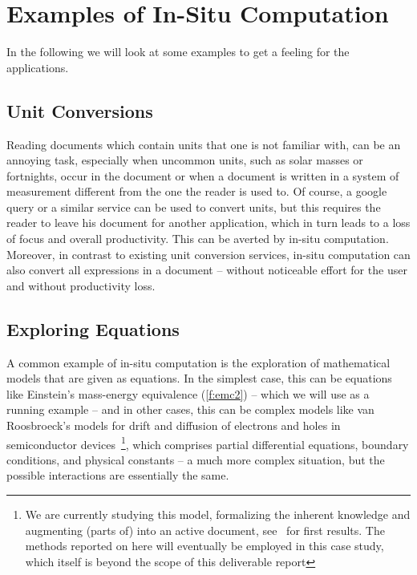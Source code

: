 \section{Examples of In-Situ Computation}\label{sec:examples}

In the following we will look at some examples to get a feeling for the applications.

\subsection{Unit Conversions}\label{sec:ex:units}
Reading documents which contain units that one is not familiar with, can be an annoying
task, especially when uncommon units, such as solar masses or fortnights, occur in the
document or when a document is written in a system of measurement different from the one
the reader is used to.  Of course, a google query or a similar service can be used to
convert units, but this requires the reader to leave his document for another application,
which in turn leads to a loss of focus and overall productivity.  This can be averted by
in-situ computation. Moreover, in contrast to existing unit conversion services, in-situ
computation can also convert all expressions in a document -- without noticeable effort
for the user and without productivity loss.


\subsection{Exploring Equations}\label{sec:ex:equations}

A common example of in-situ computation is the exploration of mathematical models that are
given as equations. In the simplest case, this can be equations like Einstein's
mass-energy equivalence (\ref{f:emc2}) -- which we will use as a running example -- and in
other cases, this can be complex models like van Roosbroeck's models for drift and
diffusion of electrons and holes in semiconductor devices~\cite{FarRotDoa:nmddm16}\footnote{We
  are currently studying this model, formalizing the inherent knowledge and augmenting
  (parts of) \cite{FarRotDoa:nmddm16} into an active document, see~\cite{KohKopMueTab:RCS} for
  first results. The methods reported on here will eventually be employed in this case
  study, which itself is beyond the scope of this deliverable report}, which comprises
partial differential equations, boundary conditions, and physical constants -- a much more
complex situation, but the possible interactions are essentially the same. 

